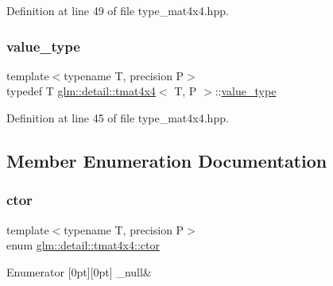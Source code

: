 Definition at line 49 of file type\+\_\+mat4x4.\+hpp.

\mbox{\label{structglm_1_1detail_1_1tmat4x4_adce6da39b62e447be40eaa843bc774e3}} 
\subsubsection{\texorpdfstring{value\+\_\+type}{value\_type}}
{\footnotesize\ttfamily template$<$typename T, precision P$>$ \\
typedef T \hyperlink{structglm_1_1detail_1_1tmat4x4}{glm\+::detail\+::tmat4x4}$<$ T, P $>$\+::\hyperlink{structglm_1_1detail_1_1tmat4x4_adce6da39b62e447be40eaa843bc774e3}{value\+\_\+type}}



Definition at line 45 of file type\+\_\+mat4x4.\+hpp.



\subsection{Member Enumeration Documentation}
\mbox{\label{structglm_1_1detail_1_1tmat4x4_a314ae2df1758ddf97e2b024c32649cef}} 
\subsubsection{\texorpdfstring{ctor}{ctor}}
{\footnotesize\ttfamily template$<$typename T, precision P$>$ \\
enum \hyperlink{structglm_1_1detail_1_1tmat4x4_a314ae2df1758ddf97e2b024c32649cef}{glm\+::detail\+::tmat4x4\+::ctor}}

\begin{DoxyEnumFields}{Enumerator}
[0pt][0pt]{}\mbox{\label{structglm_1_1detail_1_1tmat4x4_a314ae2df1758ddf97e2b024c32649cefa16fafd8cae6a9c69210c2e073c03edf0}} 
\+\_\+null&\\
\hline

\end{DoxyEnumFields}


